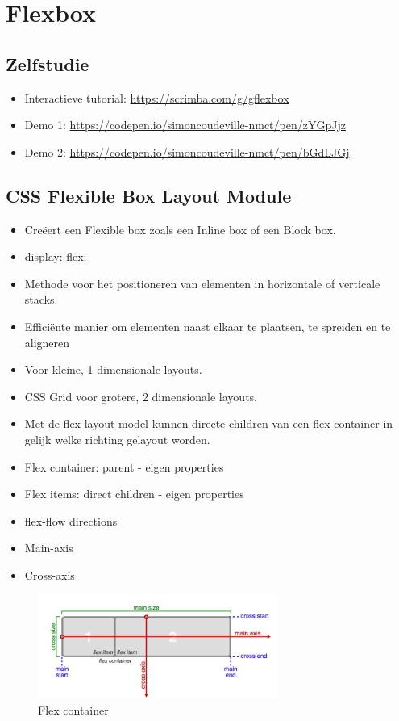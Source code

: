 \documentclass{article}
\begin{document}
\section{Flexbox}
\subsection{Zelfstudie}
\begin{itemize}
    \item Interactieve tutorial: \url{https://scrimba.com/g/gflexbox}
    \item Demo 1: \url{https://codepen.io/simoncoudeville-nmct/pen/zYGpJjz}
    \item Demo 2: \url{https://codepen.io/simoncoudeville-nmct/pen/bGdLJGj}
\end{itemize}

\subsection{CSS Flexible Box Layout Module}
\begin{itemize}
    \item Creëert een Flexible box zoals een Inline box of een Block box.
    \item display: flex;
    \item Methode voor het positioneren van elementen in horizontale of verticale stacks.
    \item Efficiënte manier om elementen naast elkaar te plaatsen, te spreiden en te aligneren
    \item Voor kleine, 1 dimensionale layouts.
    \item CSS Grid voor grotere, 2 dimensionale layouts.
    \item Met de flex layout model kunnen directe children van een flex container in gelijk welke richting gelayout worden.
    \item Flex container: parent - eigen properties
    \item Flex items: direct children - eigen properties
    \item flex-flow directions
    \item Main-axis
    \item Cross-axis
\end{itemize}

\begin{figure}[H]
    \centering
    \includegraphics[width=0.7\textwidth]{img/Screenshot_20200330_112142.png}
    \caption{Flex container}
\end{figure}
\end{document}
